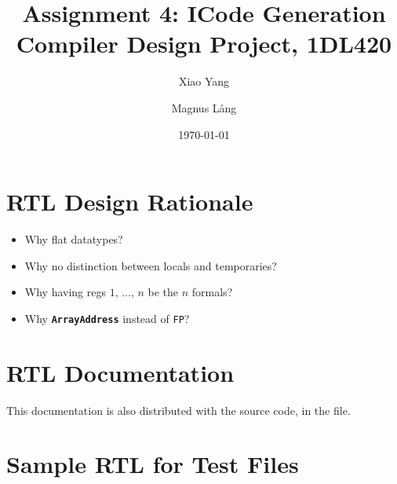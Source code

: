 \documentclass[a4paper,11pt]{article}
\title{Assignment 4: ICode Generation \\
       Compiler Design Project, 1DL420}
\author{Xiao Yang \and Magnus L{\aa}ng}
\date{\today}
\begin{document}
\maketitle

\section{RTL Design Rationale}
\begin{itemize}
  \item Why flat datatypes?
  \item Why no distinction between locals and temporaries?
  \item Why having regs $1,\, \dots,\, n$ be the $n$ formals?
  \item Why \texttt{\textbf{ArrayAddress}} instead of \texttt{FP}?
\end{itemize}

\newpage
\appendix
\renewcommand\thesection{Appendix \Alph{section}} %

\section{RTL Documentation}
This documentation is also distributed with the source code, in the
 file.

\section{Sample RTL for Test Files}
\end{document}
